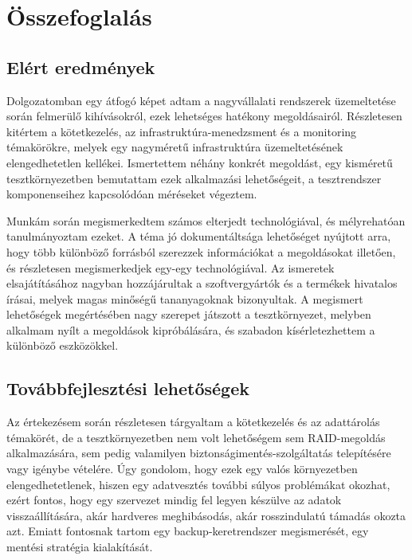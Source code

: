 
\chapter{Összefoglalás}

\section{Elért eredmények}
Dolgozatomban egy átfogó képet adtam a nagyvállalati rendszerek üzemeltetése során felmerülő kihívásokról, ezek lehetséges hatékony megoldásairól. Részletesen kitértem a kötetkezelés, az infrastruktúra-menedzsment és a monitoring témakörökre, melyek egy nagyméretű infrastruktúra üzemeltetésének elengedhetetlen kellékei. Ismertettem néhány konkrét megoldást, egy kisméretű tesztkörnyezetben bemutattam ezek alkalmazási lehetőségeit, a tesztrendszer komponenseihez kapcsolódóan méréseket végeztem.

Munkám során megismerkedtem számos elterjedt technológiával, és mélyrehatóan tanulmányoztam ezeket. A téma jó dokumentáltsága lehetőséget nyújtott arra, hogy több különböző forrásból szerezzek információkat a megoldásokat illetően, és részletesen megismerkedjek egy-egy technológiával. Az ismeretek elsajátításához nagyban hozzájárultak a szoftvergyártók és a termékek hivatalos írásai, melyek magas minőségű tananyagoknak bizonyultak. A megismert lehetőségek megértésében nagy szerepet játszott a tesztkörnyezet, melyben alkalmam nyílt a megoldások kipróbálására, és szabadon kísérletezhettem a különböző eszközökkel.

\section{Továbbfejlesztési lehetőségek}
Az értekezésem során részletesen tárgyaltam a kötetkezelés és az adattárolás témakörét, de a tesztkörnyezetben nem volt lehetőségem sem RAID-megoldás alkalmazására, sem pedig valamilyen biztonságimentés-szolgáltatás telepítésére vagy igénybe vételére. Úgy gondolom, hogy ezek egy valós környezetben elengedhetetlenek, hiszen egy adatvesztés további súlyos problémákat okozhat, ezért fontos, hogy egy szervezet mindig fel legyen készülve az adatok visszaállítására, akár hardveres meghibásodás, akár rosszindulatú támadás okozta azt. Emiatt fontosnak tartom egy backup-keretrendszer megismerését, egy mentési stratégia kialakítását.

